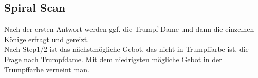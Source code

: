 
\subsection{Spiral Scan} \label{subsec:Spiral Scan}

Nach der ersten Antwort werden ggf. die Trumpf Dame und dann die einzelnen Könige erfragt und gereizt.
 \\
Nach Step1/2 ist das nächstmögliche Gebot, das nicht in Trumpffarbe ist, die Frage nach Trumpfdame. Mit dem niedrigsten mögliche Gebot in der Trumpffarbe verneint man.
